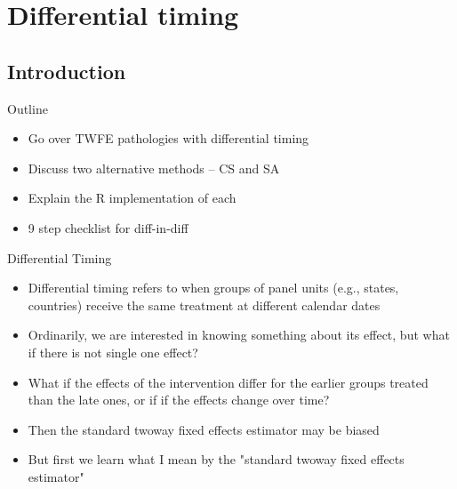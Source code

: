 \documentclass{beamer}
\begin{document}




\section{Differential timing}

\subsection{Introduction}

\begin{frame}{Outline}

\begin{itemize}

\item Go over TWFE pathologies with differential timing
\item Discuss two alternative methods -- CS and SA
\item Explain the R implementation of each
\item 9 step checklist for diff-in-diff

\end{itemize}

\end{frame}



\begin{frame}{Differential Timing}

\begin{itemize}
\item Differential timing refers to when groups of panel units (e.g., states, countries) receive the same treatment at different calendar dates
\item Ordinarily, we are interested in knowing something about its effect, but what if there is not single one effect?
\item What if the effects of the intervention differ for the earlier groups treated than the late ones, or if if the effects change over time?
\item Then the standard twoway fixed effects estimator may be biased
\item But first we learn what I mean by the "standard twoway fixed effects estimator"
\end{itemize}

\end{frame}
\end{document}
